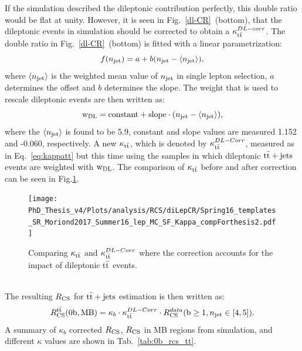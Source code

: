 \newpage
If the simulation described the dileptonic contribution perfectly, this double ratio would be flat at unity. However, it is seen in Fig.~\ref{dl-CR}~(bottom), that the dileptonic events in simulation should be corrected to obtain a $\kappa_{\rm t\bar{t}}^{DL-corr}$. 
The double ratio in Fig.~\ref{dl-CR}~(bottom) is fitted with a linear parametrization:
\begin{equation}
f(n_{\rm jet}) = a+b(n_{\rm jet}-\langle n_{\rm jet} \rangle), 
\end{equation}
where $\langle n_{\rm jet} \rangle$ is the weighted mean value of $n_{\rm jet}$ in single lepton selection, $a$ determines the offset and $b$ determines the slope.
The weight that is used to rescale dileptonic events are then written as:
\begin{equation}
\label{weight_DL}
{\rm w_{DL}} = {\rm constant}+{\rm slope}\cdot(n_{\rm jet} - \langle n_{\rm jet} \rangle),
\end{equation}
where the $\langle n_{\rm jet} \rangle$ is found to be 5.9, constant and slope values are measured 1.152 and -0.060, respectively.
A new $\kappa_{\ttbar}$, which is denoted by $\kappa_{\ttbar}^{DL-Corr}$, measured as in
Eq.~\ref{eq:kappatt} but this time using the samples in which dileptonic ${\rm t\bar{t}+jets}$ events are weighted with $\rm w_{DL}$.
The comparison of $\kappa_{\ttbar}$ before and after correction can be seen in Fig.\ref{fig:kappa_tt}.\\
\begin{figure}[!htb]
    \begin{center}
 \texttt{[image: PhD\_Thesis\_v4/Plots/analysis/RCS/diLepCR/Spring16\_templates\_SR\_Moriond2017\_Summer16\_lep\_MC\_SF\_Kappa\_compForthesis2.pdf]}
  \caption[Comparing $\kappa_{\ttbar}$ and $\kappa_{\ttbar}^{DL-Corr}$]{ \label{fig:kappa_tt} Comparing $\kappa_{\ttbar}$ and $\kappa_{\ttbar}^{DL-Corr}$ where the correction accounts for the impact of dileptonic $\rm t\bar{t}$ events.}
  \end{center}
\end{figure}
\\
The resulting $R_{\rm CS}$ for ${\rm t\bar{t}+jets}$ estimation is then written as:
\begin{equation}
\label{Final_RCS}
R^{\rm t\bar{t}}_{\rm CS}({\rm 0b},{\rm MB}) = {\kappa_b}\cdot{\kappa_{\ensuremath{\rm t\bar{t}}}^{DL-Corr}}\cdot{R_{\rm CS}^{data}({\rm b} \geq 1, \ensuremath{n_{\rm jet}}\in [4,5] )}.
\end{equation}
A summary of $\kappa_b$ corrected $R_{\rm CS}$, $R_{\rm CS}$ in MB regions from simulation, and different $\kappa$ values are shown in Tab.~\ref{tab:0b_rcs_tt}.
